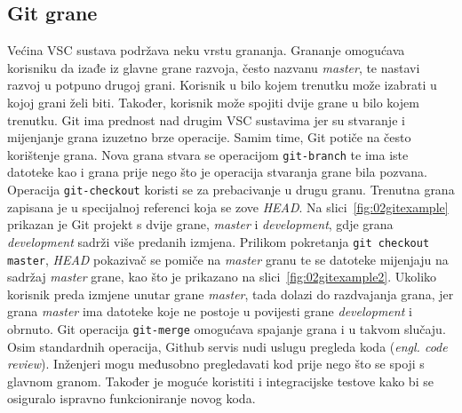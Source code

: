\subsection{Git grane}
Većina VSC sustava podržava neku vrstu grananja. Grananje omogućava korisniku da izađe iz glavne
grane razvoja, često nazvanu \textit{master}, te nastavi razvoj u potpuno drugoj grani. Korisnik u
bilo kojem trenutku može izabrati u kojoj grani želi biti. Također, korisnik može spojiti dvije
grane u bilo kojem trenutku.  Git ima prednost nad drugim VSC sustavima jer su stvaranje i
mijenjanje grana izuzetno brze operacije. Samim time, Git potiče na često korištenje grana. Nova
grana stvara se operacijom \texttt{git-branch} te ima iste datoteke kao i grana prije nego što je
operacija stvaranja grane bila pozvana. Operacija \texttt{git-checkout} koristi se za prebacivanje u
drugu granu. Trenutna grana zapisana je u specijalnoj referenci koja se zove \textit{HEAD}. Na
slici~\ref{fig:02gitexample} prikazan je Git projekt s dvije grane, \textit{master} i
\textit{development}, gdje grana \textit{development} sadrži više predanih izmjena. Prilikom
pokretanja \texttt{git checkout master}, \textit{HEAD} pokazivač se pomiče na \textit{master} granu
te se datoteke mijenjaju na sadržaj \textit{master} grane, kao što je prikazano na
slici~\ref{fig:02gitexample2}. Ukoliko korisnik preda izmjene unutar grane \textit{master}, tada
dolazi do razdvajanja grana, jer grana \textit{master} ima datoteke koje ne postoje u povijesti
grane \textit{development} i obrnuto. Git operacija \texttt{git-merge} omogućava spajanje grana i u
takvom slučaju. Osim standardnih operacija, Github servis nudi uslugu pregleda koda (\textit{engl.
code review}). Inženjeri mogu međusobno pregledavati kod prije nego što se spoji s glavnom granom.
Također je moguće koristiti i integracijske testove kako bi se osiguralo ispravno funkcioniranje
novog koda.

